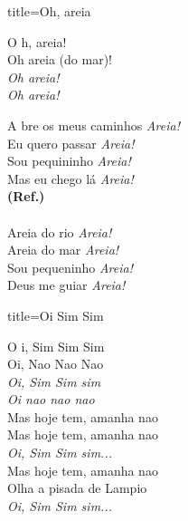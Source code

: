 \documentclass[fontsize=14pt, paper=a4, twoside, DIV=20]{scrreprt} %
\begin{document}
\begin{multicols*}{2}
\begin{song}{title={Oh, areia}}
        \begin{chorus*}
            O h, areia!\\
            Oh areia (do mar)!\\
            \textit{Oh areia!}\\
            \textit{Oh areia!}\\
        \end{chorus*}
        \begin{verse*}
            A bre os meus caminhos \textit{Areia!}\\
            Eu quero passar \textit{Areia!}\\
            Sou pequininho \textit{Areia!}\\
            Mas eu chego lá \textit{Areia!}\\
            \textbf{(Ref.)}\\
            \\
            Areia do rio \textit{Areia!}\\
            Areia do mar \textit{Areia!}\\
            Sou pequeninho \textit{Areia!}\\
            Deus me guiar \textit{Areia!}\\
        \end{verse*}
\end{song}



\begin{song}{title={Oi Sim Sim}}
        \begin{verse*}
            O i, Sim Sim Sim\\
            Oi, Nao Nao Nao\\
            \textit{Oi, Sim Sim sim}\\
            \textit{Oi nao nao nao}\\
            Mas hoje tem, amanha nao\\
            Mas hoje tem, amanha nao\\
            \textit{Oi, Sim Sim sim...}\\
            Mas hoje tem, amanha nao\\
            Olha a pisada de Lampio\\
            \textit{Oi, Sim Sim sim...}\\
        \end{verse*}
\end{song}


\end{multicols*}
\end{document}
